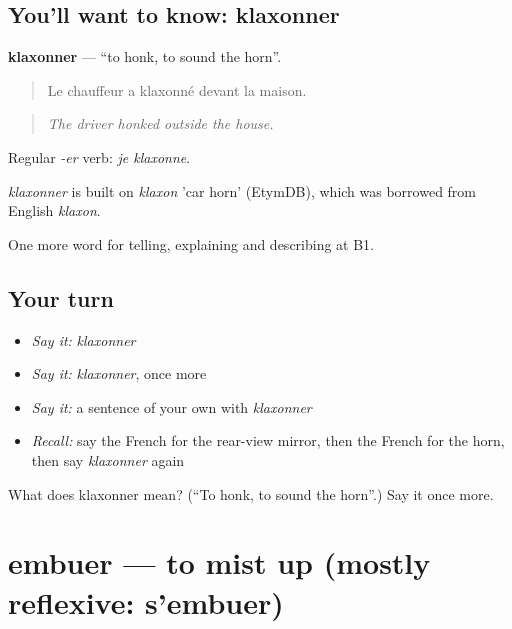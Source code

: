 \subsection*{You'll want to know: klaxonner}
\textbf{klaxonner} — \textquotedblleft{}to honk, to sound the horn\textquotedblright{}.

\begin{quote}
Le chauffeur a klaxonné devant la maison.
\end{quote}

\begin{quote}
\emph{The driver honked outside the house.}
\end{quote}

Regular \emph{-er} verb: \emph{je klaxonne}.

\begin{cousinweb}
\emph{klaxonner} is built on \emph{klaxon} 'car horn' (EtymDB), which was borrowed from English \emph{klaxon}.
\end{cousinweb}

\begin{grammarlens}[title={What you've built}]
One more word for telling, explaining and describing at B1.
\end{grammarlens}

\subsection*{Your turn}
\begin{itemize}
\raggedright
  \item \emph{Say it:} \emph{klaxonner}
  \item \emph{Say it:} \emph{klaxonner}, once more
  \item \emph{Say it:} a sentence of your own with \emph{klaxonner}
  \item \emph{Recall:} say the French for the rear-view mirror, then the French for the horn, then say \emph{klaxonner} again
\end{itemize}

\begin{tcolorbox}[breakable,colback=teal!4,colframe=teal!35!black,title={Before you move on}]
What does klaxonner mean? (\textquotedblleft{}To honk, to sound the horn\textquotedblright{}.) Say it once more.
\end{tcolorbox}
\section[embuer]{embuer — to mist up (mostly reflexive: s’embuer)}

